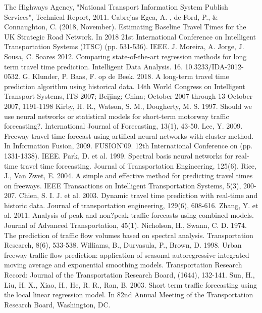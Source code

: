 \documentclass[a4paper, 10pt, conference]{ieeeconf}      %
\begin{document}
\begin{thebibliography}{00}
 The Highways Agency, "National Transport Information System Publish Services", Technical Report, 2011. 
 Cabrejas-Egea, A. , de Ford, P., \& Connaughton, C. (2018, November). Estimating Baseline Travel Times for the UK Strategic Road Network. In 2018 21st International Conference on Intelligent Transportation Systems (ITSC) (pp. 531-536). IEEE.
 J. Moreira, A. Jorge, J. Sousa, C. Soares 2012. Comparing state-of-the-art regression methods for long term travel time prediction. Intelligent Data Analysis. 16. 10.3233/IDA-2012-0532. 
 G. Klunder, P. Baas, F. op de Beek. 2018. A long-term travel time prediction algorithm using historical data. 14th World Congress on Intelligent Transport Systems, ITS 2007; Beijing; China; October 2007 through 13 October 2007, 1191-1198
 Kirby, H. R., Watson, S. M., Dougherty, M. S. 1997. Should we use neural networks or statistical models for short-term motorway traffic forecasting?. International Journal of Forecasting, 13(1), 43-50.
 Lee, Y. 2009. Freeway travel time forecast using artifical neural networks with cluster method. In Information Fusion, 2009. FUSION'09. 12th International Conference on (pp. 1331-1338). IEEE.
 Park, D. et al. 1999. Spectral basis neural networks for real-time travel time forecasting. Journal of Transportation Engineering, 125(6).
 Rice, J., Van Zwet, E. 2004. A simple and effective method for predicting travel times on freeways. IEEE Transactions on Intelligent Transportation Systems, 5(3), 200-207.
 Chien, S. I. J. et al. 2003. Dynamic travel time prediction with real-time and historic data. Journal of transportation engineering, 129(6), 608-616.
 Zhang, Y. et al. 2011. Analysis of peak and non?peak traffic forecasts using combined models. Journal of Advanced Transportation, 45(1).
 Nicholson, H., Swann, C. D. 1974. The prediction of traffic flow volumes based on spectral analysis. Transportation Research, 8(6), 533-538.
 Williams, B., Durvasula, P., Brown, D. 1998. Urban freeway traffic flow prediction: application of seasonal autoregressive integrated moving average and exponential smoothing models. Transportation Research Record: Journal of the Transportation Research Board, (1644), 132-141.
 Sun, H., Liu, H. X., Xiao, H., He, R. R., Ran, B. 2003. Short term traffic forecasting using the local linear regression model. In 82nd Annual Meeting of the Transportation Research Board, Washington, DC.

\end{thebibliography}
\end{document}
